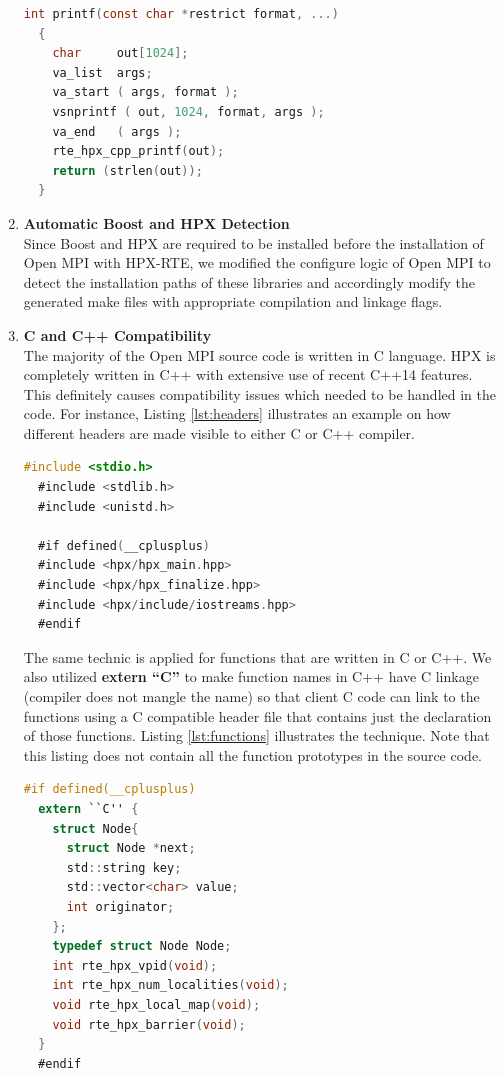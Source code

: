 \begin{enumerate}
  \begin{lstlisting}[language=C, frame=single, basicstyle=\footnotesize, caption=Intercepting printf\label{lst:printf}]
  int printf(const char *restrict format, ...)
  {
    char     out[1024];
    va_list  args;
    va_start ( args, format );
    vsnprintf ( out, 1024, format, args );
    va_end   ( args );
    rte_hpx_cpp_printf(out);
    return (strlen(out));
  }
  \end{lstlisting}

\item \textbf{Automatic Boost and HPX Detection}\\
  Since Boost and HPX are required to be installed before the installation of Open MPI with HPX-RTE, we modified the configure logic of Open MPI to detect the installation paths of these libraries and accordingly modify the generated make files with appropriate compilation and linkage flags.
\item \textbf{C and C++ Compatibility}\\
  The majority of the Open MPI source code is written in C language. HPX is completely written in C++ with extensive use of recent C++14 features. This definitely causes compatibility issues which needed to be handled in the code. For instance, Listing \ref{lst:headers} illustrates an example on how different headers are made visible to either C or C++ compiler. 
  \begin{lstlisting}[language=C, frame=single, basicstyle=\footnotesize, caption=Exposing Different Headers to C and C++ Compilers\label{lst:headers}]
  #include <stdio.h>
  #include <stdlib.h>
  #include <unistd.h>

  #if defined(__cplusplus)
  #include <hpx/hpx_main.hpp>
  #include <hpx/hpx_finalize.hpp>
  #include <hpx/include/iostreams.hpp>
  #endif
  \end{lstlisting}

  The same technic is applied for functions that are written in C or C++. We also utilized \textbf{extern ``C''} to make function names in C++ have C linkage (compiler does not mangle the name) so that client C code can link to the functions using a C compatible header file that contains just the declaration of those functions. Listing \ref{lst:functions} illustrates the technique. Note that this listing does not contain all the function prototypes in the source code.
  
  \begin{lstlisting}[language=C, frame=single, basicstyle=\footnotesize, caption=Exposing Different Functions to C and C++ Compilers\label{lst:functions}]
  #if defined(__cplusplus)
  extern ``C'' {
    struct Node{
      struct Node *next;
      std::string key;
      std::vector<char> value;
      int originator;
    };
    typedef struct Node Node;
    int rte_hpx_vpid(void);
    int rte_hpx_num_localities(void);
    void rte_hpx_local_map(void);
    void rte_hpx_barrier(void);
  }
  #endif
\end{lstlisting}


\end{enumerate}
